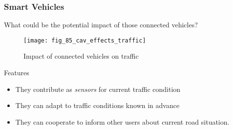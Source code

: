 \begin{frame}
    \frametitle{Smart Vehicles}
    What could be the potential impact of those connected vehicles?
    \begin{center}
        \begin{figure}
            \texttt{[image: fig\_85\_cav\_effects\_traffic]}
            \caption{Impact of connected vehicles on traffic}
        \end{figure}
    \end{center}
    \begin{alertblock}{Features}
        \begin{itemize}
            \item They contribute as \emph{sensors} for current traffic condition
            \item They can adapt to traffic conditions known in advance
            \item They can cooperate to inform other users about current road situation. 
        \end{itemize}
    \end{alertblock}
\end{frame}